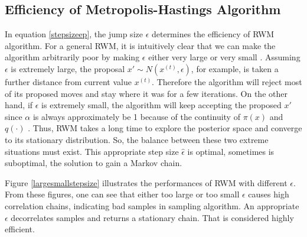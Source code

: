 



\subsection{Efficiency of Metropolis-Hastings Algorithm}\label{effMHA}

In equation \eqref{stepsizeep}, the jump size $\epsilon$ determines the efficiency of RWM algorithm. For a general RWM, it is intuitively clear that we can make the algorithm arbitrarily poor by making $\epsilon$ either very large or very small \citep{sherlock2010random}. Assuming $\epsilon$ is extremely large, the proposal $x'\sim N\left(x^{(t)},\epsilon\right)$, for example, is taken a further distance from current value $x^{(t)}$. Therefore the algorithm will reject most of its proposed moves and stay where it was for a few iterations. On the other hand, if $\epsilon$ is extremely small, the algorithm will keep accepting the proposed $x'$ since $\alpha$ is always approximately be 1 because of the continuity of $\pi(x)$ and $q(\cdot)$ \citep{roberts2001optimal}. Thus, RWM takes a long time to explore the posterior space and converge to its stationary distribution. So, the balance between these two extreme situations must exist. This appropriate step size $\hat{\epsilon}$ is optimal, sometimes is suboptimal, the solution to gain a Markov chain. 

Figure \ref{largesmallstepsize} illustrates the performances of RWM with different $\epsilon$. From these figures, one can see that either too large or too small $\epsilon$ causes high correlation chains, indicating bad samples in sampling algorithm. An appropriate $\epsilon$ decorrelates samples and returns a stationary chain. That is considered highly efficient. 


